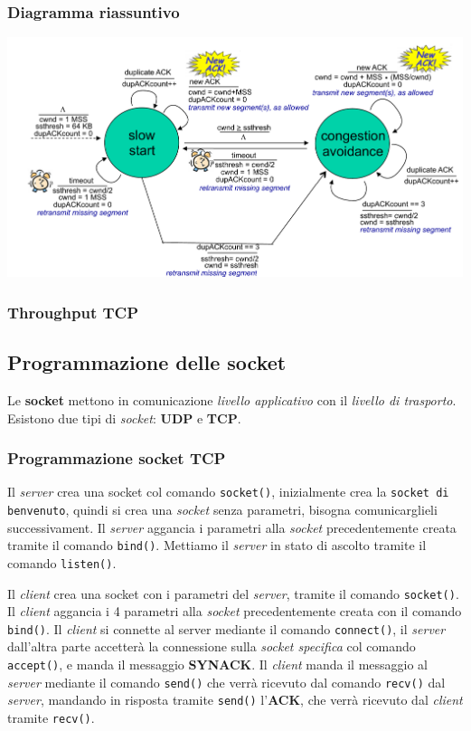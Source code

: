 \subsubsection*{Diagramma riassuntivo}
\includegraphics[width=\textwidth]{./img/diagrammacontrollodicongestione.png} \\

\subsubsection{Throughput TCP}

\subsection{Programmazione delle socket}

Le \textbf{socket} mettono in comunicazione \textit{livello applicativo} con il \textit{livello di trasporto}. 
Esistono due tipi di \textit{socket}: \textbf{UDP} e \textbf{TCP}. 

\subsubsection{Programmazione socket TCP}
Il \textit{server} crea una socket col comando \texttt{socket()}, inizialmente crea la \texttt{socket di benvenuto}, quindi si crea una \textit{socket} senza parametri, bisogna comunicarglieli successivament.
Il \textit{server} aggancia i parametri alla \textit{socket} precedentemente creata tramite il comando \texttt{bind()}. Mettiamo il \textit{server} in stato di ascolto tramite il comando \texttt{listen()}. 

Il \textit{client} crea una socket con i parametri del \textit{server}, tramite il comando \texttt{socket()}. 
Il \textit{client} aggancia i 4 parametri alla \textit{socket} precedentemente creata con il comando \texttt{bind()}. 
Il \textit{client} si connette al server mediante il comando \texttt{connect()}, il \textit{server} dall'altra parte accetterà la connessione sulla \textit{socket specifica} col comando \texttt{accept()}, e manda il messaggio \textbf{SYNACK}.
Il \textit{client} manda il messaggio al \textit{server} mediante il comando \texttt{send()} che verrà ricevuto dal comando \texttt{recv()} dal \textit{server}, mandando in risposta tramite \texttt{send()} l'\textbf{ACK}, che verrà ricevuto dal \textit{client} tramite \texttt{recv()}. 

